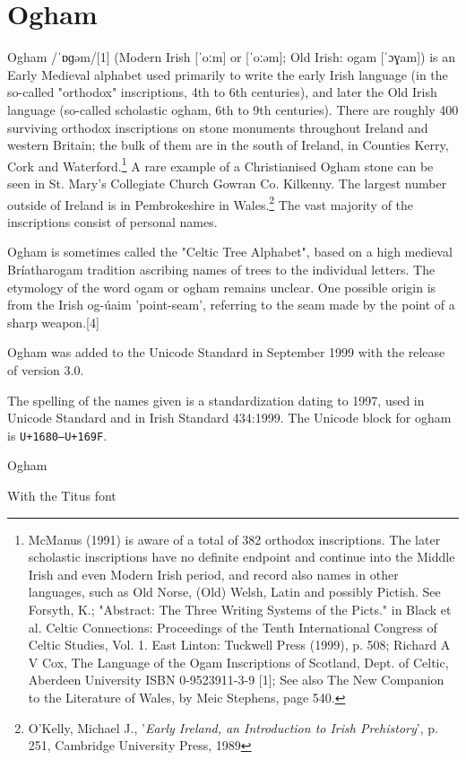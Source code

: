 \section{Ogham}
\label{s:ogham}
\newfontfamily{}

Ogham /ˈɒɡəm/[1] (Modern Irish [ˈoːm] or [ˈoːəm]; Old Irish: ogam [ˈɔɣam]) is an Early Medieval alphabet used primarily to write the early Irish language (in the so-called "orthodox" inscriptions, 4th to 6th centuries), and later the Old Irish language (so-called scholastic ogham, 6th to 9th centuries). There are roughly 400 surviving orthodox inscriptions on stone monuments throughout Ireland and western Britain; the bulk of them are in the south of Ireland, in Counties Kerry, Cork and Waterford.\footnote{McManus (1991) is aware of a total of 382 orthodox inscriptions. The later scholastic inscriptions have no definite endpoint and continue into the Middle Irish and even Modern Irish period, and record also names in other languages, such as Old Norse, (Old) Welsh, Latin and possibly Pictish. See Forsyth, K.; "Abstract: The Three Writing Systems of the Picts." in Black et al. Celtic Connections: Proceedings of the Tenth International Congress of Celtic Studies, Vol. 1. East Linton: Tuckwell Press (1999), p. 508; Richard A V Cox, The Language of the Ogam Inscriptions of Scotland, Dept. of Celtic, Aberdeen University ISBN 0-9523911-3-9 [1]; See also The New Companion to the Literature of Wales, by Meic Stephens, page 540.} A rare example of a Christianised Ogham stone can be seen in St. Mary's Collegiate Church Gowran Co. Kilkenny. The largest number outside of Ireland is in Pembrokeshire in Wales.\footnote{O'Kelly, Michael J., '\textit{Early Ireland, an Introduction to Irish Prehistory}', p. 251, Cambridge University Press, 1989} The vast majority of the inscriptions consist of personal names.

Ogham is sometimes called the "Celtic Tree Alphabet", based on a high medieval Bríatharogam tradition ascribing names of trees to the individual letters. The etymology of the word ogam or ogham remains unclear. One possible origin is from the Irish og-úaim 'point-seam', referring to the seam made by the point of a sharp weapon.[4]

Ogham was added to the Unicode Standard in September 1999 with the release of version 3.0.

The spelling of the names given is a standardization dating to 1997, used in Unicode Standard and in Irish Standard 434:1999.
The Unicode block for ogham is \texttt{U+1680–U+169F}.

\begin{scriptexample}[]{Ogham}

With the Titus font

\end{scriptexample}


